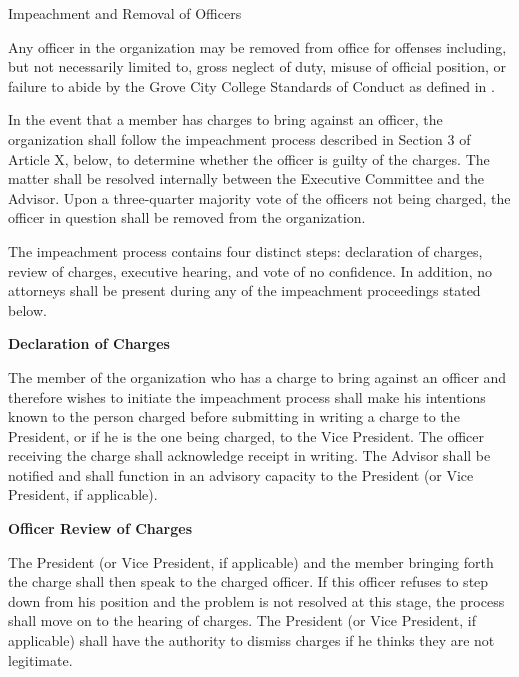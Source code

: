 {
	\begin{article}{Impeachment and Removal of Officers}
		\item Any officer in the organization may be removed from office for offenses including, but not necessarily limited to, gross neglect of duty, misuse of official position, or failure to abide by the Grove City College Standards of Conduct as defined in \crimson.
		\item In the event that a member has charges to bring against an officer, the organization shall follow the impeachment process described in Section 3 of Article X, below, to determine whether the officer is guilty of the charges. The matter shall be resolved internally between the Executive Committee and the Advisor. Upon a three-quarter majority vote of the officers not being charged, the officer in question shall be removed from the organization.
		\item The impeachment process contains four distinct steps: declaration of charges, review of charges, executive hearing, and vote of no confidence.  In addition, no attorneys shall be present during any of the impeachment proceedings stated below.
			
		\hypertarget{Declaration of Charges}{}
		\textbf{Declaration of Charges}
		
		The member of the organization who has a charge to bring against an officer and therefore wishes to initiate the impeachment process shall make his intentions known to the person charged before submitting in writing a charge to the President, or if he is the one being charged, to the Vice President. The officer receiving the charge shall acknowledge receipt in writing. The Advisor shall be notified and shall function in an advisory capacity to the President (or Vice President, if applicable).
	
		\hypertarget{Officer Review of Charges}{}
		\textbf{Officer Review of Charges}
		
		The President (or Vice President, if applicable) and the member bringing forth the charge shall then speak to the charged officer. If this officer refuses to step down from his position and the problem is not resolved at this stage, the process shall move on to the hearing of charges. The President (or Vice President, if applicable) shall have the authority to dismiss charges if he thinks they are not legitimate.
	

\end{article}}
